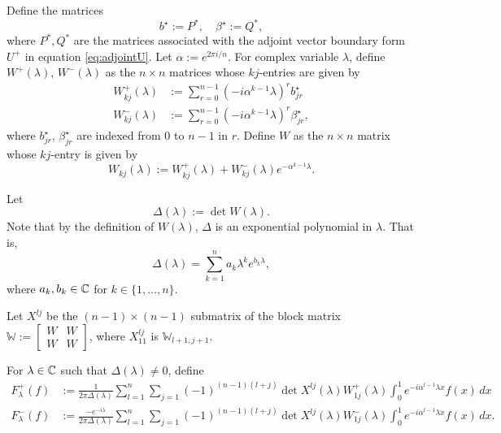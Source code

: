 \documentclass[11pt, oneside, a4paper]{article}
\begin{document}
Define the matrices 
\[b^\star := P^*,\quad \beta^\star := Q^*,\]
where $P^*, Q^*$ are the matrices associated with the adjoint vector boundary form $U^+$ in equation \ref{eq:adjointU}.
Let $\alpha := e^{2\pi i/n}$. For complex variable $\lambda$, define $W^+(\lambda)$, $W^-(\lambda)$ as the $n\times n$ matrices whose $kj$-entries are given by
\begin{subequations}\label{eq:M+/-}
    \begin{align}
        W^+_{kj}(\lambda) &:= \sum_{r=0}^{n-1}(-i\alpha^{k-1}\lambda)^r b^\star_{jr}\label{eq:M+}\\
        W^-_{kj}(\lambda) &:= \sum_{r=0}^{n-1}(-i\alpha^{k-1}\lambda)^r \beta^\star_{jr},\label{eq:M-}
    \end{align}
\end{subequations}
where $b^\star_{jr}$, $\beta^\star_{jr}$ are indexed from $0$ to $n-1$ in $r$. Define $W$ as the $n\times n$ matrix whose $kj$-entry is given by
\begin{equation}\label{eq:M}
    W_{kj}(\lambda) := W^+_{kj}(\lambda) + W^-_{kj}(\lambda)e^{-\alpha^{k-1}\lambda}.
\end{equation}

Let
\begin{equation}\label{eq:delta}
    \Delta(\lambda):=\det W(\lambda).
\end{equation}
Note that by the definition of $W(\lambda)$, $\Delta$ is an exponential polynomial \cite{Langer1931} in $\lambda$. That is,
\[\Delta(\lambda) = \sum_{k=1}^n a_k \lambda^k e^{b_k\lambda},\]
where $a_k, b_k\in\mathbb C$ for $k\in\{1,\ldots,n\}$.

Let $X^{lj}$ be the $(n-1)\times (n-1)$ submatrix of the block matrix $\mathbb{W}:=\begin{bmatrix}W & W\\ W & W\end{bmatrix}$, where $X^{lj}_{11}$ is $\mathbb{W}_{l+1, j+1}$.

For $\lambda\in\mathbb C$ such that $\Delta(\lambda)\neq 0$, define
\begin{subequations}\label{eq:F_lambda_+-}
    \begin{align}
        F^+_\lambda(f) &:= \frac{1}{2\pi \Delta(\lambda)} \sum_{l=1}^n\sum_{j=1}(-1)^{(n-1)(l+j)}\det X^{lj}(\lambda)W^+_{1j}(\lambda)\int_0^1 e^{-i\alpha^{l-1}\lambda x}f(x)\,dx \label{eq:F+}\\
        F^-_\lambda(f) &:= \frac{-e^{-i\lambda}}{2\pi \Delta(\lambda)} \sum_{l=1}^n\sum_{j=1}(-1)^{(n-1)(l+j)}\det X^{lj}(\lambda)W^-_{1j}(\lambda)\int_0^1 e^{-i\alpha^{l-1}\lambda x}f(x)\,dx. \label{eq:F-}
    \end{align}
\end{subequations}
\end{document}
